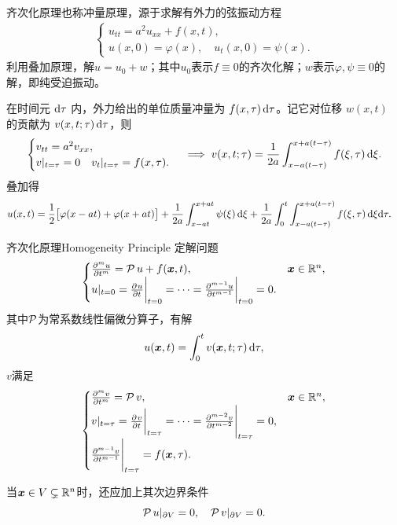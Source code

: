 齐次化原理也称冲量原理，源于求解有外力的弦振动方程
\begin{align*}
	\begin{cases}
		u_{tt} = a^2u_{xx} + f(x,t),\\
		u(x,0) = \varphi(x),\quad u_t(x,0) = \psi(x).
	\end{cases}
\end{align*}
利用叠加原理，解$u = u_0 + w$；其中$u_0$表示$f \equiv 0$的齐次化解；$w$表示$\varphi,\psi \equiv 0$的解，即纯受迫振动。

在时间元 $\d\tau$ 内，外力给出的单位质量冲量为 $f(x,\tau)\d\tau$。记它对位移 $w(x,t)$ 的贡献为 $v(x,t;\tau)\d\tau$，则
\begin{align*}
	\begin{cases}
			v_{tt} = a^2v_{xx},\\
			v|_{t=\tau} = 0\quad v_t|_{t=\tau} = f(x,\tau).
	\end{cases} \implies v(x,t;\tau) = \frac1{2a}\int_{x-a(t-\tau)}^{x+a(t-\tau)}f(\xi,\tau)\d\xi.
\end{align*}
叠加得
\begin{align}
	\begin{aligned}
		u(x,t) = {}&\frac12\bigb{\varphi(x - at) + \varphi(x + at)} + \frac1{2a}\int_{x-at}^{x+at}\psi(\xi)\d\xi + \frac1{2a}\int_0^t\int_{x-a(t-\tau)}^{x+a(t-\tau)}f(\xi,\tau)\d\xi\nd\tau.
	\end{aligned}
\end{align}
\begin{theorem}{齐次化原理}{Homogeneity Principle}
	定解问题
	\begin{equation}
		\label{eq:mmp-duhamel-forced-data}
		\begin{cases}
			\frac{\p^mu}{\p t^m} = \PDEop u + f(\bm x,t),&\bm x \in \RR^n,\\
			\eval u_{t=0} = \biggeval{\pv ut}_{t=0} = \cdots = \biggeval{\frac{\p^{m-1}u}{\p t^{m-1}}}_{t=0} = 0.
		\end{cases}
	\end{equation}
	其中$\PDEop$为常系数线性偏微分算子，有解
	\begin{equation}
		\label{eq:mmp-duhamel-principle}
		u(\bm x,t) = \int_0^tv(\bm x,t;\tau)\d\tau,
	\end{equation}
	$v$满足
	\begin{equation}
		\label{eq:mmp-duhamel-impulse-data}
		\begin{cases}
			\pv[m]vt = \PDEop v,&\bm x \in \RR^n,\\
			\eval v_{t=\tau} = \biggeval{\pv v{t}}_{t=\tau} = \cdots = \Biggeval{\pv[m - 2]vt}_{t=\tau} = 0, \\
			\Biggeval{\pv[m - 1]vt}_{t=\tau} = f(\bm x,\tau).
		\end{cases}
	\end{equation}

	当$\bm x \in V \subsetneq \RR^n$时，还应加上其次边界条件
	\[
		\eval{\PDEop u}_{\p V} = 0,\quad\eval{\PDEop v}_{\p V} = 0.
	\]
\end{theorem}

